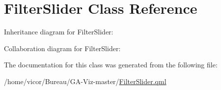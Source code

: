 \hypertarget{class_filter_slider}{}\section{Filter\+Slider Class Reference}
\label{class_filter_slider}


Inheritance diagram for Filter\+Slider\+:


Collaboration diagram for Filter\+Slider\+:


The documentation for this class was generated from the following file\+:\begin{DoxyCompactItemize}
\item 
/home/vicor/\+Bureau/\+G\+A-\/\+Viz-\/master/\hyperlink{_filter_slider_8qml}{Filter\+Slider.\+qml}\end{DoxyCompactItemize}
